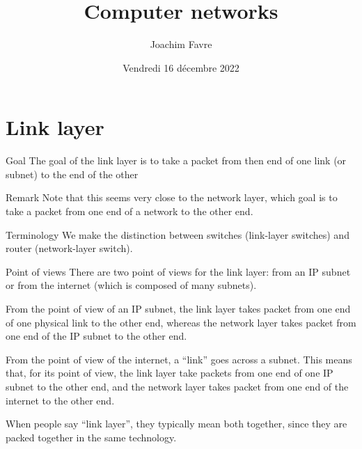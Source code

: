 \documentclass[a4paper]{article}
\title{Computer networks}
\author{Joachim Favre}
\date{Vendredi 16 décembre 2022}
\begin{document}
\maketitle


\section{Link layer}
\begin{parag}{Goal}
    The goal of the link layer is to take a packet from then end of one link (or subnet) to the end of the other

    \begin{subparag}{Remark}
        Note that this seems very close to the network layer, which goal is to take a packet from one end of a network to the other end.
    \end{subparag}
\end{parag}

\begin{parag}{Terminology}
    We make the distinction between switches (link-layer switches) and router (network-layer switch).
\end{parag}


\begin{parag}{Point of views}
    There are two point of views for the link layer: from an IP subnet or from the internet (which is composed of many subnets).

    From the point of view of an IP subnet, the link layer takes packet  from one end of one physical link to the other end, whereas the network layer takes packet from one end of the IP subnet to the other end.

    From the point of view of the internet, a ``link'' goes across a subnet. This means that, for its point of view, the link layer take packets from one end of one IP subnet to the other end, and the network layer takes packet from one end of the internet to the other end.

    When people say ``link layer'', they typically mean both together, since they are packed together in the same technology. 
\end{parag}
\end{document}
